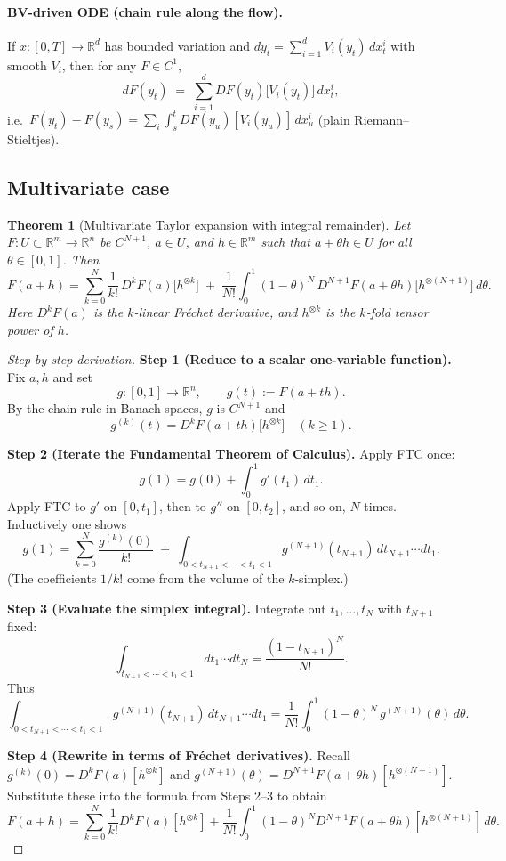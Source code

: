 \documentclass[12pt]{article}
\newtheorem{theorem}{Theorem}[section]
\begin{document}
\paragraph{BV-driven ODE (chain rule along the flow).}
If $x:[0,T]\to\mathbb{R}^d$ has bounded variation and
$dy_t=\sum_{i=1}^d V_i(y_t)\,dx_t^i$ with smooth $V_i$, then for any $F\in C^1$,
\[
dF(y_t) \;=\; \sum_{i=1}^d DF(y_t)\big[V_i(y_t)\big]\,dx_t^i,
\]
i.e.\ $F(y_t)-F(y_s)=\sum_i \int_s^t DF(y_u)[V_i(y_u)]\,dx_u^i$ (plain Riemann--Stieltjes).


\subsection{Multivariate case}

\begin{theorem}[Multivariate Taylor expansion with integral remainder]
Let $F:U\subset\mathbb{R}^m\to\mathbb{R}^n$ be $C^{N+1}$, $a\in U$, and $h\in\mathbb{R}^m$
such that $a+\theta h\in U$ for all $\theta\in[0,1]$. Then
\[
F(a+h)
= \sum_{k=0}^{N} \frac{1}{k!}\,D^kF(a)\big[h^{\otimes k}\big]
 \;+\; \frac{1}{N!}\int_0^1 (1-\theta)^N\,D^{N+1}F(a+\theta h)\big[h^{\otimes(N+1)}\big]\,d\theta.
\]
Here $D^kF(a)$ is the $k$-linear Fr\'echet derivative, and $h^{\otimes k}$ is the $k$-fold tensor power of $h$.
\end{theorem}

\begin{proof}[Step-by-step derivation]
\textbf{Step 1 (Reduce to a scalar one-variable function).}
Fix $a,h$ and set
\[
g:[0,1]\to\mathbb{R}^n,\qquad g(t):=F(a+th).
\]
By the chain rule in Banach spaces, $g$ is $C^{N+1}$ and
\[
g^{(k)}(t)=D^kF(a+th)\big[h^{\otimes k}\big]\quad (k\ge 1).
\]

\medskip
\textbf{Step 2 (Iterate the Fundamental Theorem of Calculus).}
Apply FTC once:
\[
g(1)=g(0)+\int_0^1 g'(t_1)\,dt_1.
\]
Apply FTC to $g'$ on $[0,t_1]$, then to $g''$ on $[0,t_2]$, and so on, $N$ times. Inductively one shows
\[
g(1)
= \sum_{k=0}^{N}\frac{g^{(k)}(0)}{k!}
 \;+\; \int_{0<t_{N+1}<\cdots<t_1<1} g^{(N+1)}(t_{N+1})\,dt_{N+1}\cdots dt_1.
\]
(The coefficients $1/k!$ come from the volume of the $k$-simplex.)

\medskip
\textbf{Step 3 (Evaluate the simplex integral).}
Integrate out $t_1,\dots,t_N$ with $t_{N+1}$ fixed:
\[
\int_{t_{N+1}<\cdots<t_1<1} dt_1\cdots dt_N
= \frac{(1-t_{N+1})^N}{N!}.
\]
Thus
\[
\int_{0<t_{N+1}<\cdots<t_1<1} g^{(N+1)}(t_{N+1})\,dt_{N+1}\cdots dt_1
= \frac{1}{N!}\int_0^1 (1-\theta)^N\,g^{(N+1)}(\theta)\,d\theta.
\]

\medskip
\textbf{Step 4 (Rewrite in terms of Fr\'echet derivatives).}
Recall $g^{(k)}(0)=D^kF(a)[h^{\otimes k}]$ and
$g^{(N+1)}(\theta)=D^{N+1}F(a+\theta h)[h^{\otimes (N+1)}]$.
Substitute these into the formula from Steps 2–3 to obtain
\[
F(a+h)=\sum_{k=0}^{N}\frac{1}{k!}D^kF(a)[h^{\otimes k}]
+\frac{1}{N!}\int_0^1 (1-\theta)^N D^{N+1}F(a+\theta h)[h^{\otimes (N+1)}]\,d\theta.
\]
\end{proof}
\end{document}
